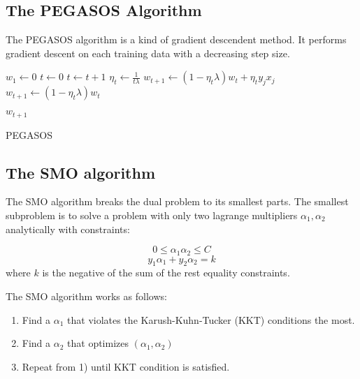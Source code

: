 \documentclass[conference]{IEEEtran}
\begin{document}
   \subsection{The PEGASOS Algorithm}
        The PEGASOS algorithm is a kind of gradient descendent method. It performs gradient descent on each training data with a decreasing step size\cite{shalev2011pegasos}.
        

        \begin{algorithm}[H]
        \begin{algorithmic}[1]
            \State $w_1 \gets 0$
            \State $t \gets 0$
                    \State $t \gets t+1$
                    \State $\eta_t \gets \frac{1}{t\lambda}$
                    \State $w_{t+1} \gets (1-\eta_t\lambda)w_t + \eta_ty_jx_j$
                    \Else
                    \State $w_{t+1} \gets (1-\eta_t\lambda)w_t$
                    \EndIf
                \EndFor
            \EndFor


            \Return $w_{t+1}$
            \EndFunction
        \end{algorithmic}
        \caption{PEGASOS}
    \end{algorithm}

    \subsection{The SMO algorithm}
    The SMO algorithm\cite{platt1998sequential} breaks the dual problem to its smallest parts. The smallest subproblem is to solve a problem with only two lagrange multipliers $\alpha_1,\alpha_2$ analytically with constraints:
    
    \begin{equation*}
        0\leq\alpha_1\alpha_2\leq C
    \end{equation*}
    \begin{equation*}
        y_1\alpha_1+y_2\alpha_2=k
    \end{equation*}
    where $k$ is the negative of the sum of the rest equality constraints.

    The SMO algorithm works as follows:
    \begin{enumerate}
        \item Find a $\alpha_1$ that violates the Karush-Kuhn-Tucker (KKT) conditions the most.
        \item Find a $\alpha_2$ that optimizes $(\alpha_1,\alpha_2)$
        \item Repeat from 1) until KKT condition is satisfied.
    \end{enumerate}
    
\end{document}
